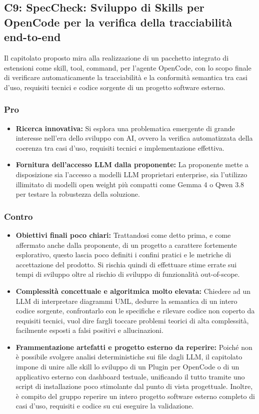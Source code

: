 \subsection{C9: SpecCheck: Sviluppo di Skills per OpenCode per la verifica della tracciabilità end-to-end}

Il capitolato proposto mira alla realizzazione di un pacchetto integrato di estensioni come skill, tool, command, per l'agente OpenCode, con lo scopo finale di verificare automaticamente la tracciabilità e la conformità semantica tra casi d'uso, requisiti tecnici e codice sorgente di un progetto software esterno.

\subsubsection{Pro}
\begin{itemize}
    \item \textbf{Ricerca innovativa:} Si esplora una problematica emergente di grande interesse nell'era dello sviluppo con AI, ovvero la verifica automatizzata della coerenza tra casi d'uso, requisiti tecnici e implementazione effettiva.
    \item \textbf{Fornitura dell'accesso LLM dalla proponente:} La proponente mette a disposizione sia l'accesso a modelli LLM proprietari enterprise, sia l'utilizzo illimitato di modelli open weight più compatti come Gemma 4 o Qwen 3.8 per testare la robustezza della soluzione.
\end{itemize}

\subsubsection{Contro}
\begin{itemize}
    \item \textbf{Obiettivi finali poco chiari:} Trattandosi come detto prima, e come affermato anche dalla proponente, di un progetto a carattere fortemente esplorativo, questo lascia poco definiti i confini pratici e le metriche di accettazione del prodotto. Si rischia quindi di effettuare stime errate sui tempi di sviluppo oltre al rischio di sviluppo di funzionalità out-of-scope.
    \item \textbf{Complessità concettuale e algoritmica molto elevata:} Chiedere ad un LLM di interpretare diagrammi UML, dedurre la semantica di un intero codice sorgente, confrontarlo con le specifiche e rilevare codice non coperto da requisiti tecnici, vuol dire fargli toccare problemi teorici di alta complessità, facilmente esposti a falsi positivi e allucinazioni.
    \item \textbf{Frammentazione artefatti e progetto esterno da reperire:} Poiché non è possibile svolgere analisi deterministiche sui file dagli LLM, il capitolato impone di unire alle skill lo sviluppo di un Plugin per OpenCode o di un applicativo esterno con dashboard testuale, unificando il tutto tramite uno script di installazione poco stimolante dal punto di vista progettuale. Inoltre, è compito del gruppo reperire un intero progetto software esterno completo di casi d'uso, requisiti e codice su cui eseguire la validazione.
\end{itemize}

